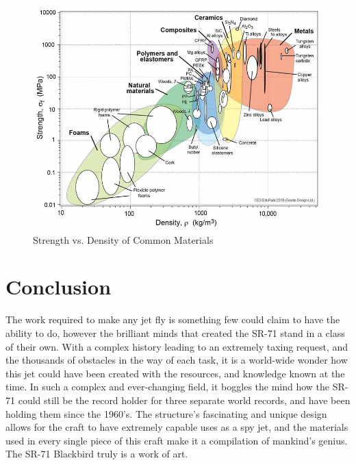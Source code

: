 \documentclass[conf]{new-aiaa}
\begin{document}
\begin{figure}
    \centering
    \includegraphics[width=.75\linewidth]{image2.png}
    \caption{Strength vs. Density of Common Materials}
    \label{fig2}
\end{figure}


\section{Conclusion}
The work required to make any jet fly is something few could claim to have the ability to do, however the brilliant minds that created the SR-71 stand in a class of their own. With a complex history leading to an extremely taxing request, and the thousands of obstacles in the way of each task, it is a world-wide wonder how this jet could have been created with the resources, and knowledge known at the time. In such a complex and ever-changing field, it boggles the mind how the SR-71 could still be the record holder for three separate world records, and have been holding them since the 1960's. The structure's fascinating and unique design allows for the craft to have extremely capable uses as a spy jet, and the materials used in every single piece of this craft make it a compilation of mankind's genius. The SR-71 Blackbird truly is a work of art.

\newpage
\printbibliography[]
\end{document}
